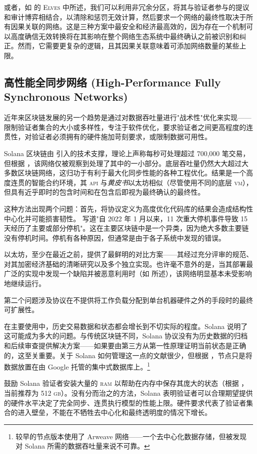 或者，如 \cite{cryptoeprint:2024/961} 的 \textsc{Elves} 中所述，我们可以利用非冗余分区，将其与验证者参与的提议和审计博弈相结合，以清除和惩罚无效计算，然后要求一个网络的最终性取决于所有因果关联的网络。这是三种方案中最安全和经济最高效的，因为存在一个机制可以高度确信无效转换将在其影响在整个网络生态系统中最终确认之前被识别和纠正。然而，它需要更复杂的逻辑，且其因果关联意味着可添加网络数量的某些上限。

\subsection{高性能全同步网络 (High-Performance Fully Synchronous Networks)}

近年来区块链发展的另一个趋势是通过对数据吞吐量进行"战术性"优化来实现——限制验证者集合的大小或多样性，专注于软件优化，要求验证者之间更高程度的连贯性，对验证者必须拥有的硬件施加苛刻要求，或限制数据可用性。

Solana 区块链由 \cite{yakovenko2018solana} 引入的技术支撑，理论上声称每秒可处理超过 700,000 笔交易，但根据 \cite{ng2024is}，该网络仅被观察到处理了其中的一小部分。底层吞吐量仍然大大超过大多数区块链网络，这归功于有利于最大化同步性能的各种工程优化。结果是一个高度连贯的智能合约环境，其 \textsc{api} 与\emph{黄皮书}以太坊相似（尽管使用不同的底层 \textsc{vm}），但具有近乎即时的包含时间和在包含后即视为最终确认的最终性。

这种方法出现两个问题：首先，将协议定义为高度优化代码库的结果会造成结构性中心化并可能损害韧性。\cite{jha2024solana} 写道"自 2022 年 1 月以来，11 次重大停机事件导致 15 天经历了主要或部分停机"。这在主要区块链中是一个异类，因为绝大多数主要链没有停机时间。停机有各种原因，但通常是由于各子系统中发现的错误。

以太坊，至少在最近之前，提供了最鲜明的对比方案——其经过充分评审的规范、对其加密经济基础的清晰研究以及多个独立实现。也许毫不意外的是，当其部署最广泛的实现中发现一个缺陷并被恶意利用时（如 \cite{hertig2016so} 所述），该网络明显基本未受影响地继续运行。

第二个问题涉及协议在不提供将工作负载分配到单台机器硬件之外的手段时的最终可扩展性。

在主要使用中，历史交易数据和状态都会增长到不切实际的程度。Solana 说明了这可能成为多大的问题。与传统区块链不同，Solana 协议没有为历史数据的归档和后续审查提供解决方案——如果要由第三方从第一性原理证明当前状态是正确的，这至关重要。关于 Solana 如何管理这一点的文献很少，但根据 \cite{solana2023solana}，节点只是将数据放置在由 Google 托管的集中式数据库上。\footnote{较早的节点版本使用了 Arweave 网络——一个去中心化数据存储，但被发现对 Solana 所需的数据吞吐量来说不可靠。}

鼓励 Solana 验证者安装大量的 \textsc{ram} 以帮助在内存中保存其庞大的状态（根据 \cite{solana2024solana}，当前推荐为 512 \textsc{gb}）。没有分而治之的方法，Solana 表明验证者可以合理期望提供的硬件水平决定了完全同步、连贯执行模型的性能上限。硬件要求代表了验证者集合的进入壁垒，不能在不牺牲去中心化和最终透明度的情况下增长。
